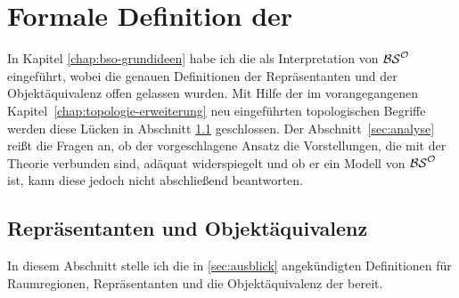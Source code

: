 \chapter{Formale Definition der \strukt}\label{chap:bso-struktur}
    In Kapitel \ref{chap:bso-grundideen} habe ich die \strukt als Interpretation von $\mathcal{BS}^{\mathcal{O}}$ eingeführt, wobei die genauen Definitionen der Repräsentanten und der Objektäquivalenz offen gelassen wurden. 
    Mit Hilfe der im vorangegangenen Kapitel~\ref{chap:topologie-erweiterung} neu eingeführten topologischen Begriffe werden diese Lücken in Abschnitt \ref{sec:univ-2} geschlossen.
    Der Abschnitt~\ref{sec:analyse} reißt die Fragen an, ob der vorgeschlagene Ansatz die Vorstellungen, die mit der Theorie verbunden sind, adäquat widerspiegelt und ob er ein Modell von $\mathcal{BS}^{\mathcal{O}}$ ist, kann diese jedoch nicht abschließend beantworten.
% 


    \section{Repräsentanten und Objektäquivalenz}\label{sec:univ-2}
    In diesem Abschnitt stelle ich die in \ref{sec:ausblick} angekündigten Definitionen für Raumregionen, Repräsentanten und die Objektäquivalenz der \strukt bereit.
    
%     


